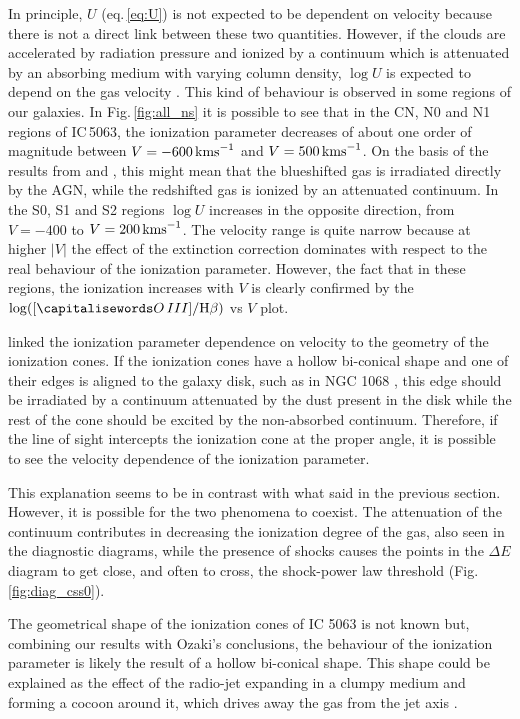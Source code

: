 \documentclass[../main.tex]{subfiles}
\begin{document}
In principle, $U$ (eq.\,\ref{eq:U}) is not expected to be dependent on velocity because there is not a direct link between these two quantities.
However, if the clouds are accelerated by radiation pressure and ionized by a continuum which is attenuated by an absorbing medium with varying column density, $\log U$ is expected to depend on the gas velocity \citep{Ozaki09}.
This kind of behaviour is observed in some regions of our galaxies.
In Fig.\,\ref{fig:all_ns} it is possible to see that in the CN, N0 and N1 regions of IC\,5063, the ionization parameter decreases of about one order of magnitude between $V=-600\,\si{\kms}$ and $V=500\,\si{\kms}$.
On the basis of the results from \citet{Kraemer00} and \citet{Ozaki09}, this might mean that the blueshifted gas is irradiated directly by the AGN, while the redshifted gas is ionized by an attenuated continuum.
In the S0, S1 and S2 regions $\log U$ increases in the opposite direction, from $V=-400$ to $V=200\,\si{\kms}$.
The velocity range is quite narrow because at higher $\lvert V \rvert$ the effect of the extinction correction dominates with respect to the real behaviour of the ionization parameter.
However, the fact that in these regions, the ionization increases with $V$ is clearly confirmed by the $\log([\ion{O}{III}]/\Hb)$ vs $V$ plot.

\citet{Ozaki09} linked  the ionization parameter dependence on velocity to the geometry of the ionization cones.
If the ionization cones have a hollow bi-conical shape and one of their edges is aligned to the galaxy disk, such as in NGC 1068 \citep{Cecil02, Das06}, this edge should be irradiated by a continuum attenuated by the dust present in the disk while the rest of the cone should be excited by the non-absorbed continuum.
Therefore, if the line of sight intercepts the ionization cone at the proper angle, it is possible to see the velocity dependence of the ionization parameter.

This explanation seems to be in contrast with what said in the previous section.
However, it is possible for the two phenomena to coexist. 
The attenuation of the continuum contributes in decreasing the ionization degree of the gas, also seen in the diagnostic diagrams, while the presence of shocks causes the points in the $\Delta E$ diagram to get close, and often to cross, the shock-power law threshold (Fig.\,\ref{fig:diag_css0}).

The geometrical shape of the ionization cones of IC 5063 is not known but, combining our results with Ozaki's conclusions, the behaviour of the ionization parameter is likely the result of a hollow bi-conical shape. 
This shape could be explained as the effect of the radio-jet expanding in a clumpy medium and forming a cocoon around it, which drives away the gas from the jet axis \citep{Morganti15,Dasyra15} . 
\end{document}
